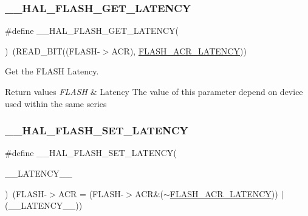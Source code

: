 \subsubsection{\texorpdfstring{\+\_\+\+\_\+\+H\+A\+L\+\_\+\+F\+L\+A\+S\+H\+\_\+\+G\+E\+T\+\_\+\+L\+A\+T\+E\+N\+CY}{\_\_HAL\_FLASH\_GET\_LATENCY}}
{\footnotesize\ttfamily \#define \+\_\+\+\_\+\+H\+A\+L\+\_\+\+F\+L\+A\+S\+H\+\_\+\+G\+E\+T\+\_\+\+L\+A\+T\+E\+N\+CY(\begin{DoxyParamCaption}{ }\end{DoxyParamCaption})~(R\+E\+A\+D\+\_\+\+B\+IT((F\+L\+A\+SH-\/$>$A\+CR), \hyperlink{group___peripheral___registers___bits___definition_gaef5e44cbb084160a6004ca9951ec7318}{F\+L\+A\+S\+H\+\_\+\+A\+C\+R\+\_\+\+L\+A\+T\+E\+N\+CY}))}



Get the F\+L\+A\+SH Latency. 


\begin{DoxyRetVals}{Return values}
{\em F\+L\+A\+SH} & Latency The value of this parameter depend on device used within the same series \\
\hline
\end{DoxyRetVals}
\mbox{\label{group___f_l_a_s_h___e_m___latency_gac1c9f459b798cc3700b90a6245df5a1a}} 
\subsubsection{\texorpdfstring{\+\_\+\+\_\+\+H\+A\+L\+\_\+\+F\+L\+A\+S\+H\+\_\+\+S\+E\+T\+\_\+\+L\+A\+T\+E\+N\+CY}{\_\_HAL\_FLASH\_SET\_LATENCY}}
{\footnotesize\ttfamily \#define \+\_\+\+\_\+\+H\+A\+L\+\_\+\+F\+L\+A\+S\+H\+\_\+\+S\+E\+T\+\_\+\+L\+A\+T\+E\+N\+CY(\begin{DoxyParamCaption}\item[{}]{\+\_\+\+\_\+\+L\+A\+T\+E\+N\+C\+Y\+\_\+\+\_\+ }\end{DoxyParamCaption})~(F\+L\+A\+SH-\/$>$A\+CR = (F\+L\+A\+SH-\/$>$A\+CR\&($\sim$\hyperlink{group___peripheral___registers___bits___definition_gaef5e44cbb084160a6004ca9951ec7318}{F\+L\+A\+S\+H\+\_\+\+A\+C\+R\+\_\+\+L\+A\+T\+E\+N\+CY})) $\vert$ (\+\_\+\+\_\+\+L\+A\+T\+E\+N\+C\+Y\+\_\+\+\_\+))}



